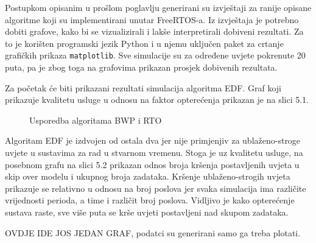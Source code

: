 \documentclass[../zavrsni.tex]{subfiles}
\begin{document}
\sloppy

\justifying

Postupkom opisanim u prošlom poglavlju generirani su izvještaji za ranije opisane algoritme koji su implementirani unutar FreeRTOS-a.
Iz izvještaja je potrebno dobiti grafove, kako bi se vizualizirali i lakše interpretirali dobiveni rezultati. 
Za to je korišten programski jezik Python i u njemu uključen paket za crtanje grafičkih prikaza \texttt{matplotlib}. 
Sve simulacije su za određene uvjete pokrenute 20 puta, pa je zbog toga na grafovima prikazan prosjek dobivenih rezultata. 

Za početak će biti prikazani rezultati simulacija algoritma EDF. Graf koji prikazuje kvalitetu usluge u odnosu na faktor opterećenja 
prikazan je na slici 5.1. 
\begin{figure}[!htb]
    \caption{\label{fig:my-label} Usporedba algoritama BWP i RTO}
\end{figure}
Algoritam EDF je izdvojen od ostala dva jer nije primjenjiv za ublaženo-stroge
uvjete u sustavima za rad u stvarnom vremenu. Stoga je uz kvalitetu usluge, na posebnom grafu na slici 5.2 prikazan odnos broja kršenja 
postavljenih uvjeta u skip over modelu i ukupnog broja zadataka. Kršenje ublaženo-strogih uvjeta prikazuje se relativno u odnosu na broj 
poslova jer svaka simulacija ima različite vrijednosti perioda, a time i različit broj poslova.
Vidljivo je kako opterećenje sustava raste, sve više puta se krše uvjeti postavljeni nad 
skupom zadataka.

OVDJE IDE JOS JEDAN GRAF, podatci su generirani samo ga treba plotati.
\end{document}
